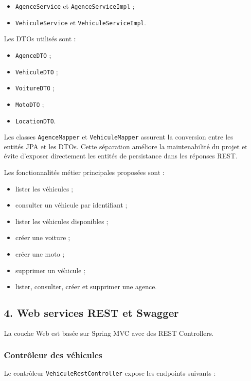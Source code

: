 \documentclass[12pt,a4paper]{article}
\newcommand{\code}[1]{\texttt{#1}}
\newcommand{\question}[1]{\subsection*{#1}}
\begin{document}
\begin{itemize}
    \item \code{AgenceService} et \code{AgenceServiceImpl} ;
    \item \code{VehiculeService} et \code{VehiculeServiceImpl}.
\end{itemize}

Les DTOs utilisés sont :

\begin{itemize}
    \item \code{AgenceDTO} ;
    \item \code{VehiculeDTO} ;
    \item \code{VoitureDTO} ;
    \item \code{MotoDTO} ;
    \item \code{LocationDTO}.
\end{itemize}

Les classes \code{AgenceMapper} et \code{VehiculeMapper} assurent la conversion entre les entités JPA et les DTOs.
Cette séparation améliore la maintenabilité du projet et évite d'exposer directement les entités de persistance dans les réponses REST.

Les fonctionnalités métier principales proposées sont :

\begin{itemize}
    \item lister les véhicules ;
    \item consulter un véhicule par identifiant ;
    \item lister les véhicules disponibles ;
    \item créer une voiture ;
    \item créer une moto ;
    \item supprimer un véhicule ;
    \item lister, consulter, créer et supprimer une agence.
\end{itemize}

\question{4. Web services REST et Swagger}

La couche Web est basée sur Spring MVC avec des REST Controllers.

\subsubsection*{Contrôleur des véhicules}

Le contrôleur \code{VehiculeRestController} expose les endpoints suivants :
\end{document}
